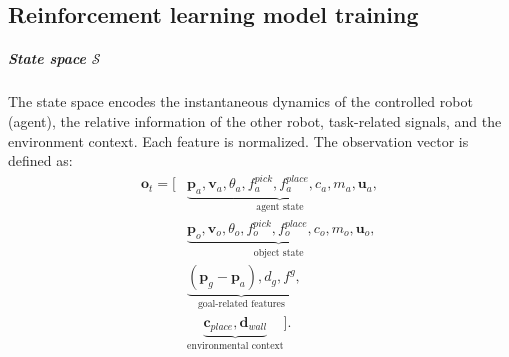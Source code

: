 \documentclass[english, 12pt, a4paper, elec, utf8, a-2b, online]{aaltothesis}
\begin{document}
\subsection{Reinforcement learning model training}

\subparagraph{State space $\mathcal{S}$}
The state space encodes the instantaneous dynamics of the controlled robot (agent), the relative information of the other robot, task-related signals, and the environment context. Each feature is normalized. The observation vector is defined as:
\begin{equation}
\begin{aligned}
\mathbf{o}_t = \big[ 
    &\underbrace{\mathbf{p}_a, \mathbf{v}_a, \theta_a, f^{pick}_a, f^{place}_a, c_a, m_a, \mathbf{u}_a}_{\text{agent state}}, \\
    &\underbrace{\mathbf{p}_o, \mathbf{v}_o, \theta_o, f^{pick}_o, f^{place}_o, c_o, m_o, \mathbf{u}_o}_{\text{object state}}, \\
    &\underbrace{(\mathbf{p}_{g}-\mathbf{p}_a), d_g, f^{g}}_{\text{goal-related features}}, \\
    &\underbrace{\mathbf{c}_{place}, \mathbf{d}_{wall}}_{\text{environmental context}}
\big].
\end{aligned}
\end{equation}
\end{document}
